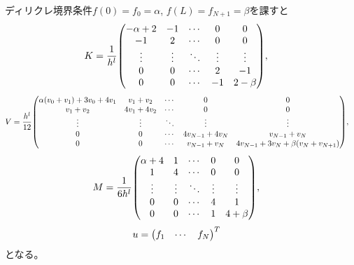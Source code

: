 \documentclass[xelatex,ja=standard]{bxjsarticle}
\begin{document}
ディリクレ境界条件$f(0) = f_0 = \alpha$, $f(L) = f_{N+1} = \beta$を課すと
\begin{align}
    K&=
     \frac{1}{h^l}\mqty(
     -\alpha + 2 & -1 & \cdots & 0 & 0\\
     -1 & 2 & \cdots & 0 & 0\\
     \vdots & \vdots & \ddots & \vdots  & \vdots\\
     0 & 0 & \cdots & 2 & -1 \\
     0 & 0 & \cdots & -1 & 2 - \beta \\
     ),
\end{align}
\begin{align}
     V&= \frac{h^l}{12}\mqty(
        \alpha\qty(v_{0} +v_{1}) + 3v_{0} + 4v_{1} & v_{1} +v_{2} & \cdots & 0 & 0\\
        v_{1} +v_{2} & 4v_{1} + 4v_{2} & \cdots & 0 & 0\\
        \vdots & \vdots & \ddots & \vdots  & \vdots\\
        0 & 0 & \cdots & 4v_{N-1} + 4v_{N} & v_{N-1} +v_{N} \\
        0 & 0 & \cdots & v_{N-1} +v_{N} & 4v_{N-1} + 3v_{N}+\beta\qty(v_{N} +v_{N+1}) \\
        ),
\end{align}
\begin{align}
    M&=
     \frac{1}{6h^l}\mqty(
     \alpha + 4 & 1 & \cdots & 0 & 0\\
     1 & 4 & \cdots & 0 & 0\\
     \vdots & \vdots & \ddots & \vdots  & \vdots\\
     0 & 0 & \cdots & 4 & 1\\
     0 & 0 & \cdots & 1 & 4+\beta \\
     ),
\end{align}
\begin{align}
    u&=\mqty(f_1 & \cdots & f_N)^T
\end{align}
となる。
\end{document}

